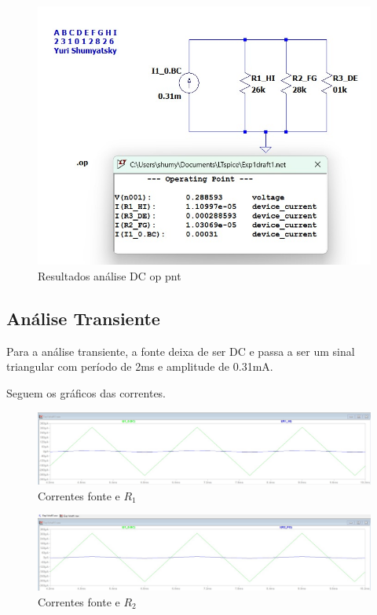 \documentclass[10pt,twocolumn,letterpaper]{article}
\begin{document}
\begin{figure}[h]
\caption{Resultados análise DC op pnt}
\includegraphics[scale=0.2]{figuras/fig3}
\end{figure}

\subsection{Análise Transiente}

Para a análise transiente, a fonte deixa de ser DC e passa a ser um sinal triangular com período de 2ms e amplitude de 0.31mA.

Seguem os gráficos das correntes.

\begin{figure}[h]
\caption{Correntes fonte e $R_1$}
\includegraphics[scale=0.14]{figuras/fig4}
\end{figure}

\begin{figure}[h]
\caption{Correntes fonte e $R_2$}
\includegraphics[scale=0.14]{figuras/fig5}
\end{figure}
\end{document}
